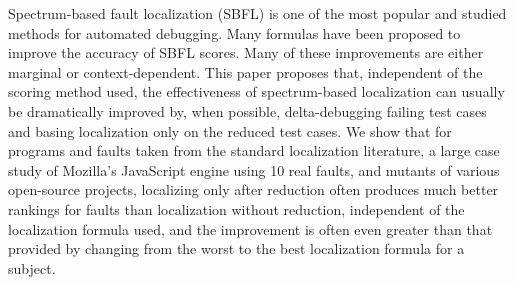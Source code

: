 Spectrum-based fault localization (SBFL) is one of the most popular and studied methods for automated debugging. Many formulas have been proposed to improve the accuracy of SBFL scores. Many of these improvements are either marginal or context-dependent.  This paper proposes that, independent of the scoring method used, the effectiveness of spectrum-based localization can usually be dramatically improved by, when possible, delta-debugging failing test cases and basing localization only on the reduced test cases. We show that for programs and faults taken from the standard localization literature, a large case study of Mozilla's JavaScript engine using 10 real faults, and mutants of various open-source projects, localizing only after reduction often produces much better rankings for faults than localization without reduction, independent of the localization formula used, and the improvement is often even greater than that provided by changing from the worst to the best localization formula for a subject.
